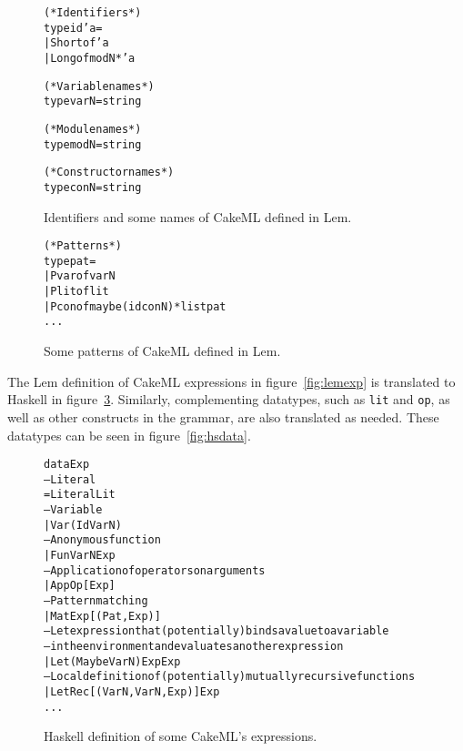 \begin{figure}
\begin{alltt}
  (* Identifiers *)
  type id 'a =
    | Short of 'a
    | Long of modN * 'a


  (* Variable names *)
  type varN = string

  (* Module names *)
  type modN = string

  (* Constructor names *)
  type conN = string

\end{alltt}
\caption{Identifiers and some names of CakeML defined in Lem.}
\label{fig:lemid}
\end{figure}

\begin{figure}
\begin{alltt}
  (* Patterns *)
  type pat =
    | Pvar of varN
    | Plit of lit
    | Pcon of maybe (id conN) * list pat
    ...
\end{alltt}
\caption{Some patterns of CakeML defined in Lem.}
\label{fig:lempat}
\end{figure}

The Lem definition of CakeML expressions in figure~\ref{fig:lemexp} is
translated to Haskell in figure~\ref{fig:hsexp}.
Similarly, complementing datatypes, such as \texttt{lit} and
\texttt{op}, as well as other constructs in the grammar, are also translated
as needed. These datatypes can be seen in figure~\ref{fig:hsdata}.

\begin{figure}
\begin{alltt}
  data Exp
    -- Literal
    = Literal Lit
    -- Variable
    | Var (Id VarN)
    -- Anonymous function
    | Fun VarN Exp
    -- Application of operators on arguments
    | App Op [Exp]
    -- Pattern matching
    | Mat Exp [(Pat, Exp)]
    -- Let expression that (potentially) binds a value to a variable
    -- in the environment and evaluates another expression
    | Let (Maybe VarN) Exp Exp
    -- Local definition of (potentially) mutually recursive functions
    | LetRec [(VarN, VarN, Exp)] Exp
    ...
\end{alltt}
\caption{Haskell definition of some CakeML's expressions.}
\label{fig:hsexp}
\end{figure}

